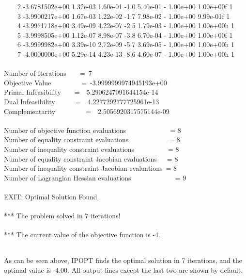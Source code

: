 \documentclass[letter,12pt]{article}
\begin{document}
\begin{small}
{~~~~2  -3.6781502e+00 1.32e-03 1.60e-01  -1.0 5.40e-01    -  1.00e+00 1.00e+00f  1\\
~~~~3  -3.9900217e+00 1.67e-03 1.22e-02  -1.7 7.98e-02    -  1.00e+00 9.99e-01f  1\\
~~~~4  -3.9971718e+00 3.49e-09 4.22e-07  -2.5 1.79e-03    -  1.00e+00 1.00e+00h  1\\
~~~~5  -3.9998505e+00 1.12e-07 8.98e-07  -3.8 6.70e-04    -  1.00e+00 1.00e+00f  1\\
~~~~6  -3.9999982e+00 3.39e-10 2.72e-09  -5.7 3.69e-05    -  1.00e+00 1.00e+00h  1\\
~~~~7  -4.0000000e+00 5.29e-14 4.23e-13  -8.6 4.60e-07    -  1.00e+00 1.00e+00h  1\\
\\
Number of Iterations~~~~=~7\\
Objective Value~~~~~~~~~=~-3.9999999974945193e+00\\
Primal Infeasibility~~~~=~~5.2906247091644154e-14\\
Dual Infeasibility~~~~~~=~~4.2277292777725961e-13\\
Complementarity~~~~~~~~~=~~2.5056920317575144e-09\\
\\
Number of objective function evaluations~~~~~~~~~~~~~= 8\\
Number of equality constraint evaluations~~~~~~~~~~~~= 8\\
Number of inequality constraint evaluations~~~~~~~~~~= 8\\
Number of equality constraint Jacobian evaluations~~~= 8\\
Number of inequality constraint Jacobian evaluations~= 8\\
Number of Lagrangian Hessian evaluations~~~~~~~~~~~~~= 9\\
\\
EXIT: Optimal Solution Found.\\
\\
*** The problem solved in 7 iterations!\\
\\
*** The current value of the objective function is -4.
}\\\\
\end{small}
As can be seen above, IPOPT finds the optimal solution in 7 iterations,
and the optimal value is -4.00. All output lines except the last two are shown
by default.
\end{document}
